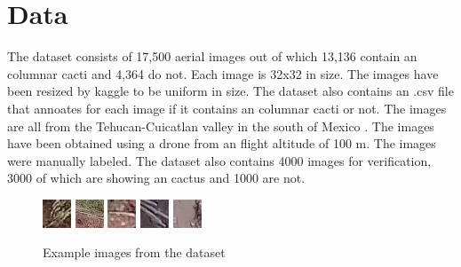 
\section{Data}
The dataset\cite{KAGGLEDATA} consists of 17,500 aerial images out of which 13,136 contain an columnar cacti  and 4,364 do not.  Each image is 32x32 in size. The images have been resized by kaggle to be uniform in size. The dataset also contains an .csv file that annoates for each image if it contains an columnar cacti or not. The images are all from the Tehucan-Cuicatlan valley in the south of Mexico \cite{LOPEZJIMENEZ2019}. The images have been obtained using a drone from an flight altitude of 100 m. The images were manually labeled. The dataset also contains 4000 images for verification, 3000 of which are showing an cactus and 1000 are not.
\begin{figure}[h]
    \includegraphics[width=.09\textwidth]{images/1.jpg}
     \includegraphics[width=.09\textwidth]{images/2.jpg}
    \includegraphics[width=.09\textwidth]{images/3.jpg}
    \includegraphics[width=.09\textwidth]{images/4.jpg}
    \includegraphics[width=.09\textwidth]{images/5.jpg}
    \caption{Example images from the dataset}
\end{figure}
